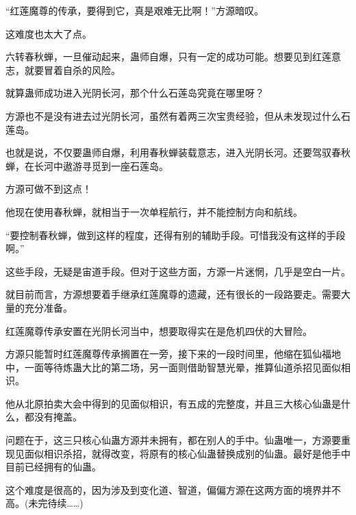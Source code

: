 \begin{this_body}
“红莲魔尊的传承，要得到它，真是艰难无比啊！”方源暗叹。

这难度也太大了点。

六转春秋蝉，一旦催动起来，蛊师自爆，只有一定的成功可能。想要见到红莲意志，就要冒着自杀的风险。

就算蛊师成功进入光阴长河，那个什么石莲岛究竟在哪里呀？

方源也不是没有进去过光阴长河，虽然有着两三次宝贵经验，但从未发现过什么石莲岛。

也就是说，不仅要蛊师自爆，利用春秋蝉装载意志，进入光阴长河。还要驾驭春秋蝉，在长河中遨游寻觅到一座石莲岛。

方源可做不到这点！

他现在使用春秋蝉，就相当于一次单程航行，并不能控制方向和航线。

“要控制春秋蝉，做到这样的程度，还得有别的辅助手段。可惜我没有这样的手段啊。”

这些手段，无疑是宙道手段。但对于这些方面，方源一片迷惘，几乎是空白一片。

就目前而言，方源想要着手继承红莲魔尊的遗藏，还有很长的一段路要走。需要大量的充分准备。

红莲魔尊传承安置在光阴长河当中，想要取得实在是危机四伏的大冒险。

方源只能暂时红莲魔尊传承搁置在一旁，接下来的一段时间里，他缩在狐仙福地中，一面等待炼蛊大比的第二场，另一面则借助智慧光晕，推算仙道杀招见面似相识。

他从北原拍卖大会中得到的见面似相识，有五成的完整度，并且三大核心仙蛊是什么，都没有掩盖。

问题在于，这三只核心仙蛊方源并未拥有，都在别人的手中。仙蛊唯一，方源要重现见面似相识杀招，就得改变，将原有的核心仙蛊替换成别的仙蛊。最好是他手中目前已经拥有的仙蛊。

这个难度是很高的，因为涉及到变化道、智道，偏偏方源在这两方面的境界并不高。(未完待续……)

\end{this_body}

